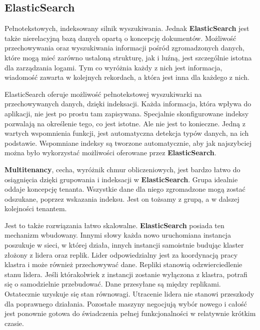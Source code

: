 \subsection{ElasticSearch}
\label{chapter:application:elkstack:elasticsearch}
    Pełnotekstowych, indeksowany silnik wyszukiwania. Jednak \textbf{ElasticSearch} jest także
    nierelacyjną bazą danych opartą o koncepcję dokumentów. Możliwość przechowywania oraz wyszukiwania
    informacji pośród zgromadzonych danych, które mogą mieć zarówno ustaloną strukturę, jak i  luźną, jest
    szczególnie istotna dla zarządzania logami. Tym co wyróżnia każdy z nich jest informacja, wiadomość
    zawarta w kolejnych rekordach, a która jest inna dla każdego z nich. 
    
    ElasticSearch oferuje możliwość pełnotekstowej wyszukiwarki na przechowywanych danych, dzięki
    indeksacji. Każda informacja, która wpływa do aplikacji, nie jest po prostu tam zapisywana.
    Specjalnie skonfigurowane indeksy pozwalają na określenie tego, co jest istotne. Ale nie jest
    to konieczne. Jedną z wartych wspomnienia funkcji, jest automatyczna detekcja typów danych, na ich
    podstawie. Wspomniane indeksy są tworzone automatycznie, aby jak najszybciej można było
    wykorzystać możliwości oferowane przez \textbf{ElasticSearch}.
    
    \textbf{Multitenancy}, cecha, wyróżnik chmur obliczeniowych, jest bardzo łatwo do osiągnięcia
    dzięki grupowania i indeksacji w \textbf{ElasticSearch}. Grupa idealnie oddaje koncepcję tenanta.
    Wszystkie dane dla niego zgromadzone mogą zostać odszukane, poprzez wskazania indeksu. Jest on
    tożsamy z grupą, a w dalszej kolejności tenantem.
    
    Jest to także rozwiązania łatwo skalowalne. \textbf{ElasticSearch} posiada ten mechanizm wbudowany.
    Innymi słowy każda nowo uruchomiana instancja poszukuje w sieci, w której działa, innych instancji
    samoistnie budując klaster złożony z lidera oraz replik. 
    Lider odpowiedzialny jest za koordynacją pracy klastra i może również przechowywać dane.
    Repliki stanowią odzwierciedlenie stanu lidera. Jeśli którakolwiek z instancji zostanie wyłączona z klastra,
    potrafi się o samodzielnie przebudować. Dane przesyłane są między replikami. Ostatecznie uzyskuje się
    stan równowagi. Utracenie lidera nie stanowi przeszkody dla poprawnego działania. Pozostałe maszyny 
    negocjują wybór nowego i całość jest ponownie gotowa do świadczenia pełnej funkcjonalności w relatywnie
    krótkim czasie.
    
